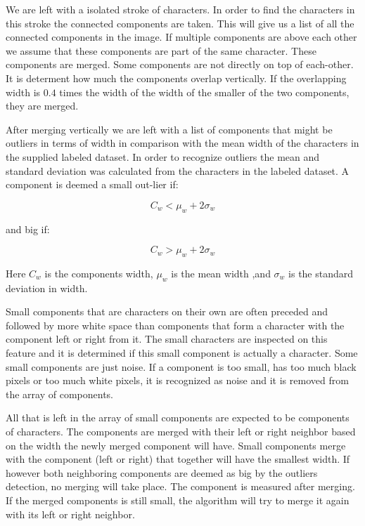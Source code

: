 

We are left with a isolated stroke of characters. In order to find the characters in this stroke the connected components are taken. This will give us a list of all the connected components in the image. If multiple components are above each other we assume that these components are part of the same character. These components are merged. Some components are not directly on top of each-other. It is determent how much the components overlap vertically. If the overlapping width is $0.4$ times the width of the width of the smaller of the two components, they are merged. 

After merging vertically we are left with a list of components that might be outliers in terms of width in comparison with the mean width of the characters in the supplied labeled dataset. In order to recognize outliers the mean and standard deviation was calculated from the characters in the labeled dataset. A component is deemed a small out-lier if:

\begin{equation}
C_w < \mu_w + 2 \sigma_w 
\end{equation}

and big if:

\begin{equation}
C_w > \mu_w + 2 \sigma_w 
\end{equation}

Here $C_w$ is the components width, $\mu_w$ is the mean width ,and $\sigma_w$ is the standard deviation in width.


Small components that are characters on their own are often preceded and followed by more white space than components that form a character with the component left or right from it. The small characters are inspected on this feature and it is determined if this small component is actually a character. Some small components are just noise. If a component is too small, has too much black pixels or too much white pixels, it is recognized as noise and it is removed from the array of components. 


All that is left in the array of small components are expected to be components of characters. The components are merged with their left or right neighbor based on the width the newly merged component will have. Small components merge with the component (left or right) that together will have the smallest width. If however both neighboring components are deemed as big by the outliers detection, no merging will take place. The component is measured after merging. If the merged components is still small, the algorithm will try to merge it again with its left or right neighbor.

